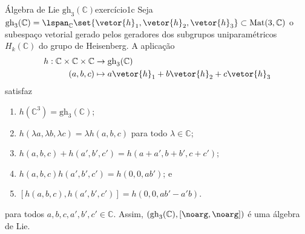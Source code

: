 \begin{proposition}{Álgebra de Lie \(\mathrm{gh}_3(\mathbb{C})\)}{exercício1c}
    Seja \(\mathrm{gh}_3(\mathbb{C}) = \lspan_{\mathbb{C}}\set{\vetor{h}_1,\vetor{h}_2, \vetor{h}_3} \subset \mathrm{Mat}(3,\mathbb{C})\) o subespaço vetorial gerado pelos geradores dos subgrupos uniparamétricos \(H_k(\mathbb{C})\) do grupo de Heisenberg. A aplicação
    \begin{align*}
        h : \mathbb{C} \times \mathbb{C} \times \mathbb{C} &\to \mathrm{gh}_3(\mathbb{C})\\
                                                   (a,b,c) &\mapsto a\vetor{h}_1 + b\vetor{h}_2 + c\vetor{h}_3
    \end{align*}
    satisfaz
    \begin{enumerate}[label=(\roman*)]
        \item \(h(\mathbb{C}^3) = \mathrm{gh}_3(\mathbb{C})\);
        \item \(h(\lambda a, \lambda b, \lambda c) = \lambda h(a,b,c)\) para todo \(\lambda \in \mathbb{C}\);
        \item \(h(a,b,c) + h(a',b',c') = h(a+a', b+b', c+c')\);
        \item \(h(a,b,c) h(a', b', c') = h(0,0,ab')\); e
        \item \([h(a,b,c), h(a',b',c')] = h(0,0,ab' - a'b)\).
    \end{enumerate}
    para todos \(a,b,c,a',b',c' \in \mathbb{C}\). Assim, \(\left(\mathrm{gh}_3(\mathbb{C}), [\noarg,\noarg]\right)\) é uma álgebra de Lie.
\end{proposition}

